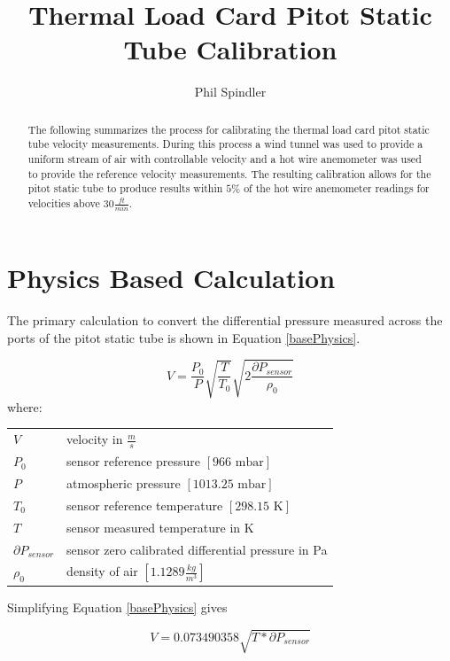 \documentclass[]{article}
\title{Thermal Load Card Pitot Static Tube Calibration}
\author{Phil Spindler}
\makeatletter
\newenvironment{conditions}
{\par\vspace{\abovedisplayskip}\noindent\begin{tabular}{>{$}l<{$} @{${}={}$} l}}
	{\end{tabular}\par\vspace{\belowdisplayskip}}
\makeatother
\begin{document}
\maketitle

\begin{abstract}

The following summarizes the process for calibrating the thermal load card pitot static tube velocity measurements.  During this process a wind tunnel was used to provide a uniform stream of air with controllable velocity and a hot wire anemometer was used to provide the reference velocity measurements.  The resulting calibration allows for the pitot static tube to produce results within $5\%$ of the hot wire anemometer readings for velocities above $30 \frac{ft}{min}$.

\end{abstract}

\section{Physics Based Calculation}

The primary calculation to convert the differential pressure measured across the ports of the pitot static tube is shown in Equation \ref{basePhysics}.

\begin{equation}\label{basePhysics}
V = \frac{P_0}{P}\sqrt{\frac{T}{T_0}}\sqrt{2 \frac{\partial P_{sensor}}{\rho_0}}
\end{equation}
where:
\begin{conditions}
 V		& velocity in $\frac{m}{s}$ \\
 P_0	& sensor reference pressure $\left[ 966 \mbox{ mbar} \right] $ \\
 P		& atmospheric pressure $\left[1013.25 \mbox{ mbar} \right] $ \\
 T_0	& sensor reference temperature $\left[298.15 \mbox{ K} \right] $ \\
 T		& sensor measured temperature in K \\
 \partial P_{sensor}	& sensor zero calibrated differential pressure in Pa \\
 \rho_0	& density of air $ \left[ 1.1289 \frac{kg}{m^3} \right] $ \\
\end{conditions}

\noindent
Simplifying Equation \ref{basePhysics} gives

\begin{equation}\label{simplifiedPhysics}
V = 0.073490358 \sqrt{ T * \partial P_{sensor} }
\end{equation}
\end{document}
